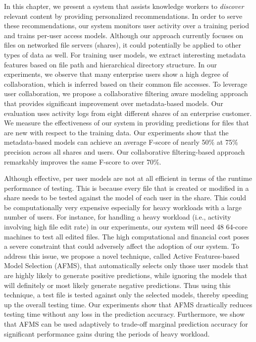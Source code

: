 In this chapter, we present a system that assists knowledge workers to
\textit{discover} relevant content by providing personalized
recommendations.  In order to serve these recommendations, our system
monitors user activity over a training period and trains per-user
access models.  Although our approach currently focuses on files on
networked file servers (shares), it could potentially be applied to other types
of data as well.  For training user models, we extract interesting
metadata features based on file path and hierarchical directory
structure.  In our experiments, we observe that many enterprise users
show a high degree of collaboration, which is inferred based on their
common file accesses.  To leverage user collaboration, we propose a
collaborative filtering aware modeling approach that provides
significant improvement over metadata-based models.  Our evaluation
uses activity logs from eight different shares of an enterprise
customer.  We measure the effectiveness of our system in providing
predictions for files that are new with respect to the training data.
Our experiments show that the metadata-based models can achieve an
average F-score of nearly 50\% at 75\% precision across all shares and users.
Our collaborative filtering-based approach remarkably improves the
same F-score to over 70\%.

Although effective, per user models are not at all efficient in terms
of the runtime performance of testing.  This is because every file
that is created or modified in a share needs to be tested against the
model of each user in the share.  This could be computationally very expensive
especially for heavy workloads with a large number of users.  For
instance, for handling a heavy workload (i.e., activity
involving high file edit rate) in our experiments, our system will
need 48 64-core machines to test all edited files.  The high computational and financial cost poses a severe
constraint that could adversely affect the adoption of our system.  To
address this issue, we propose a novel technique, called Active
Features-based Model Selection (AFMS), that automatically selects only
those user models that are highly likely to generate positive
predictions, while ignoring the models that will definitely or most likely generate
negative predictions.  Thus using this technique, a test file is
tested against only the selected models, thereby speeding up the
overall testing time.  Our experiments show that AFMS drastically
reduces testing time without any loss in the prediction accuracy.
Furthermore, we show that AFMS can be used adaptively to trade-off
marginal prediction accuracy for significant performance gains during
the periods of heavy workload.


